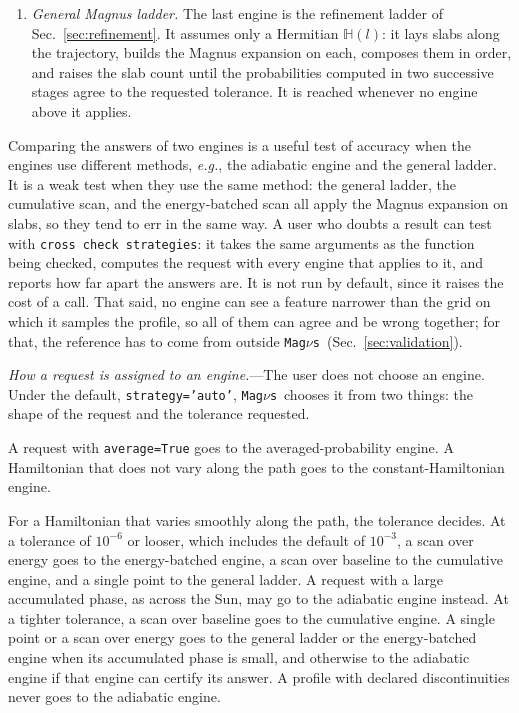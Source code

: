 \documentclass[final,5p,times,twocolumn,sort,compress]{elsarticle}
\makeatletter
\newcommand{\eg}{{\it e.g.}}
\DeclareRobustCommand{\_}{%
  \ifmmode\nfss@text{\textunderscore}\else\textunderscore\allowbreak\fi}
\newcommand{\magnus}{{\tt Mag}\ensuremath{\nu}{\tt s}}
\makeatother
\begin{document}
\begin{enumerate}
\smallskip
\item \emph{General Magnus ladder.} The last engine is the refinement ladder of Sec.~\ref{sec:refinement}. It assumes only a Hermitian $\mathbb{H}(l)$: it lays slabs along the trajectory, builds the Magnus expansion on each, composes them in order, and raises the slab count until the probabilities computed in two successive stages agree to the requested tolerance. It is reached whenever no engine above it applies.
\end{enumerate}

Comparing the answers of two engines is a useful test of accuracy when the engines use different methods, \eg, the adiabatic engine and the general ladder. It is a weak test when they use the same method: the general ladder, the cumulative scan, and the energy-batched scan all apply the Magnus expansion on slabs, so they tend to err in the same way. A user who doubts a result can test with {\tt cross\_check\_strategies}: it takes the same arguments as the function being checked, computes the request with every engine that applies to it, and reports how far apart the answers are. It is not run by default, since it raises the cost of a call. That said, no engine can see a feature narrower than the grid on which it samples the profile, so all of them can agree and be wrong together; for that, the reference has to come from outside \magnus\ (Sec.~\ref{sec:validation}).

\smallskip

\textit{How a request is assigned to an engine.}---The user does not choose an engine. Under the default, {\tt strategy='auto'}, \magnus\ chooses it from two things: the shape of the request and the tolerance requested.

A request with {\tt average=True} goes to the averaged-probability engine. A Hamiltonian that does not vary along the path goes to the constant-Hamiltonian engine.

For a Hamiltonian that varies smoothly along the path, the tolerance decides. At a tolerance of $10^{-6}$ or looser, which includes the default of $10^{-3}$, a scan over energy goes to the energy-batched engine, a scan over baseline to the cumulative engine, and a single point to the general ladder. A request with a large accumulated phase, as across the Sun, may go to the adiabatic engine instead. At a tighter tolerance, a scan over baseline goes to the cumulative engine. A single point or a scan over energy goes to the general ladder or the energy-batched engine when its accumulated phase is small, and otherwise to the adiabatic engine if that engine can certify its answer. A profile with declared discontinuities never goes to the adiabatic engine.
\end{document}
